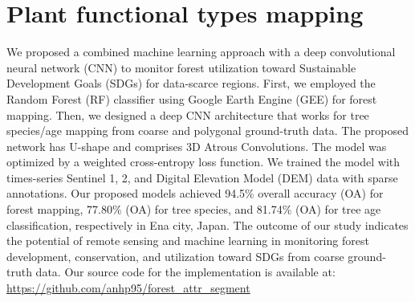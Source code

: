 \chapter{Plant functional types mapping}
We proposed a combined machine learning approach with a deep convolutional neural network (CNN) to monitor forest utilization toward Sustainable Development Goals (SDGs) for data-scarce regions. First, we employed the Random Forest (RF) classifier using Google Earth Engine (GEE) for forest mapping. Then, we designed a deep CNN architecture that works for tree species/age mapping from coarse and polygonal ground-truth data. The proposed network has U-shape and comprises 3D Atrous Convolutions. The model was optimized by a weighted cross-entropy loss function. We trained the model with times-series Sentinel 1, 2, and Digital Elevation Model (DEM) data with sparse annotations. Our proposed models achieved 94.5\% overall accuracy (OA) for forest mapping, 77.80\% (OA) for tree species, and 81.74\% (OA) for tree age classification, respectively in Ena city, Japan. The outcome of our study indicates the potential of remote sensing and machine learning in monitoring forest development, conservation, and utilization toward SDGs from coarse ground-truth data. Our source code for the implementation is available at: \url{https://github.com/anhp95/forest_attr_segment}
\renewcommand{\headrulewidth}{0pt}
\lhead[\thepage]{\leftmark}
\rhead[\leftmark]{\thepage}
\cfoot[]{}

